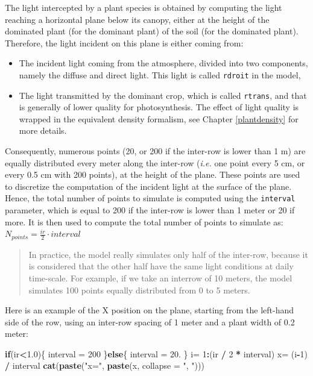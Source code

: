 \documentclass[]{book}
\newenvironment{Shaded}{\begin{snugshade}}{\end{snugshade}}
\newcommand{\KeywordTok}[1]{\textcolor[rgb]{0.13,0.29,0.53}{\textbf{#1}}}
\newcommand{\DataTypeTok}[1]{\textcolor[rgb]{0.13,0.29,0.53}{#1}}
\newcommand{\DecValTok}[1]{\textcolor[rgb]{0.00,0.00,0.81}{#1}}
\newcommand{\FloatTok}[1]{\textcolor[rgb]{0.00,0.00,0.81}{#1}}
\newcommand{\StringTok}[1]{\textcolor[rgb]{0.31,0.60,0.02}{#1}}
\newcommand{\ControlFlowTok}[1]{\textcolor[rgb]{0.13,0.29,0.53}{\textbf{#1}}}
\newcommand{\OperatorTok}[1]{\textcolor[rgb]{0.81,0.36,0.00}{\textbf{#1}}}
\newcommand{\NormalTok}[1]{#1}
\providecommand{\tightlist}{%
  \setlength{\itemsep}{0pt}\setlength{\parskip}{0pt}}
\theoremstyle{definition}
\theoremstyle{definition}
\theoremstyle{definition}
\theoremstyle{remark}
\begin{document}
The light intercepted by a plant species is obtained by computing the
light reaching a horizontal plane below its canopy, either at the height
of the dominated plant (for the dominant plant) of the soil (for the
dominated plant). Therefore, the light incident on this plane is either
coming from:

\begin{itemize}
\tightlist
\item
  The incident light coming from the atmosphere, divided into two
  components, namely the diffuse and direct light. This light is called
  \texttt{rdroit} in the model,
\item
  The light transmitted by the dominant crop, which is called
  \texttt{rtrans}, and that is generally of lower quality for
  photosynthesis. The effect of light quality is wrapped in the
  equivalent density formalism, see Chapter \ref{plantdensity} for more
  details.
\end{itemize}

Consequently, numerous points (20, or 200 if the inter-row is lower than
1 m) are equally distributed every meter along the inter-row
(\emph{i.e.} one point every 5 cm, or every 0.5 cm with 200 points), at
the height of the plane. These points are used to discretize the
computation of the incident light at the surface of the plane.\\
Hence, the total number of points to simulate is computed using the
\texttt{interval} parameter, which is equal to 200 if the inter-row is
lower than 1 meter or 20 if more. It is then used to compute the total
number of points to simulate as:
\(N_{points}=\frac{ir}{2}\cdot interval\)

\begin{quote}
In practice, the model really simulates only half of the inter-row,
because it is considered that the other half have the same light
conditions at daily time-scale. For example, if we take an interrow of
10 meters, the model simulates 100 points equally distributed from 0 to
5 meters.
\end{quote}

Here is an example of the X position on the plane, starting from the
left-hand side of the row, using an inter-row spacing of 1 meter and a
plant width of 0.2 meter:

\begin{Shaded}
\begin{Highlighting}[]
\ControlFlowTok{if}\NormalTok{(ir}\OperatorTok{<}\FloatTok{1.0}\NormalTok{)\{}
\NormalTok{  interval =}\StringTok{ }\DecValTok{200}
\NormalTok{\}}\ControlFlowTok{else}\NormalTok{\{}
\NormalTok{  interval =}\StringTok{ }\DecValTok{20}\NormalTok{.}
\NormalTok{\}}
\NormalTok{i=}\StringTok{ }\DecValTok{1}\OperatorTok{:}\NormalTok{(ir }\OperatorTok{/}\StringTok{ }\DecValTok{2} \OperatorTok{*}\StringTok{ }\NormalTok{interval)}
\NormalTok{x=}\StringTok{ }\NormalTok{(i}\OperatorTok{-}\DecValTok{1}\NormalTok{) }\OperatorTok{/}\StringTok{ }\NormalTok{interval}
\KeywordTok{cat}\NormalTok{(}\KeywordTok{paste}\NormalTok{(}\StringTok{"x="}\NormalTok{, }\KeywordTok{paste}\NormalTok{(x, }\DataTypeTok{collapse =} \StringTok{", "}\NormalTok{)))}
\end{Highlighting}
\end{Shaded}
\end{document}
